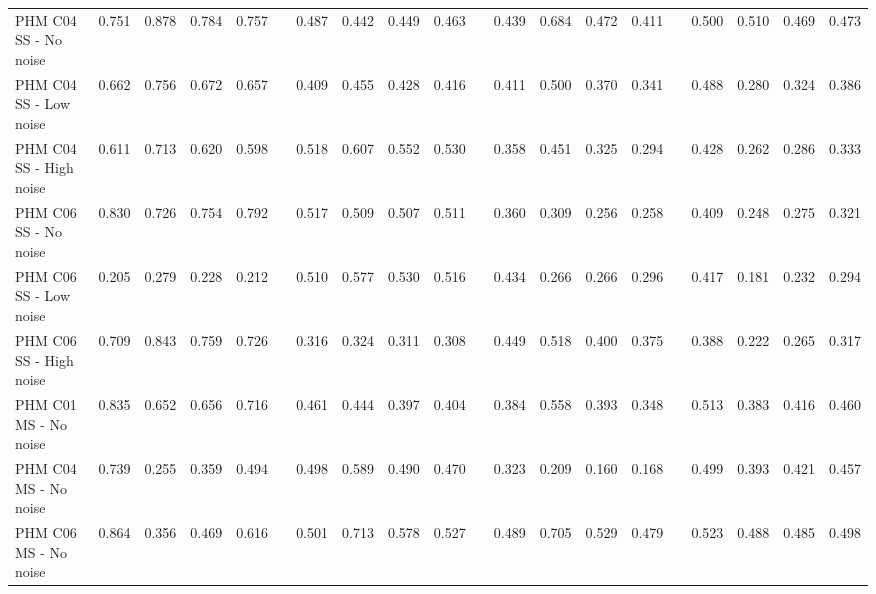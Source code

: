 \documentclass[referee, sn-mathphys-num]{sn-jnl}
\begin{document}
\begin{appendices}
\begin{sidewaystable}
{\begin{tabular}{@{}l| rrrr @{}c| rrrr @{}c| rrrr @{}c| rrrr@{}}
					PHM C04 SS - No noise &\textcolor{dblue}{0.751} &\textcolor{dblue}{0.878} &\textcolor{dblue}{0.784} & \textcolor{dblue}{0.757} & & 0.487 &0.442 &0.449 &0.463 & &0.439 &0.684 &0.472 &0.411 & &0.500 &0.510 &0.469&0.473\\
					PHM C04 SS - Low noise &\textcolor{dblue}{0.662} &\textcolor{dblue}{0.756} &\textcolor{dblue}{0.672} & \textcolor{dblue}{0.657} & & 0.409 &0.455 &0.428 &0.416 & &0.411 &0.500 &0.370 &0.341 & &0.488 &0.280 &0.324&0.386\\
					PHM C04 SS - High noise &\textcolor{dblue}{0.611} &\textcolor{dblue}{0.713} &\textcolor{dblue}{0.620} & \textcolor{dblue}{0.598} & & 0.518 &0.607 &0.552 &0.530 & &0.358 &0.451 &0.325 &0.294 & &0.428 &0.262 &0.286&0.333\\ \hdashline
					
					PHM C06 SS - No noise &\textcolor{dblue}{0.830} &\textcolor{dblue}{0.726} &\textcolor{dblue}{0.754} & \textcolor{dblue}{0.792} & & 0.517 &0.509 &0.507 &0.511 & &0.360 &0.309 &0.256 &0.258 & &0.409 &0.248 &0.275&0.321\\
					PHM C06 SS - Low noise &0.205 &0.279 &0.228 & 0.212 & & \textcolor{dblue}{0.510} &\textcolor{dblue}{0.577} &\textcolor{dblue}{0.530} &\textcolor{dblue}{0.516} & &0.434 &0.266 &0.266 &0.296 & &0.417 &0.181 &0.232&0.294\\
					PHM C06 SS - High noise &\textcolor{dblue}{0.709} &\textcolor{dblue}{0.843} &\textcolor{dblue}{0.759 }& \textcolor{dblue}{0.726} & & 0.316 &0.324 &0.311 &0.308 & &0.449 &0.518 &0.400 &0.375 & &0.388 &0.222 &0.265&0.317\\ \midrule
					
					PHM C01 MS - No noise &\textcolor{dblue}{0.835} &\textcolor{dblue}{0.652} &\textcolor{dblue}{0.656} & \textcolor{dblue}{0.716} & & 0.461 &0.444 &0.397 &0.404 & &0.384 &0.558 &0.393 &0.348 & &0.513 &0.383 &0.416&0.460\\
					PHM C04 MS - No noise &\textcolor{dblue}{0.739} &0.255 &0.359 & \textcolor{dblue}{0.494} & & 0.498 &\textcolor{dblue}{0.589 }&\textcolor{dblue}{0.490} &0.470 & &0.323 &0.209 &0.160 &0.168 & &0.499 &0.393 &0.421&0.457\\
					PHM C06 MS - No noise &\textcolor{dblue}{0.864} &0.356 &0.469 & \textcolor{dblue}{0.616} & & 0.501 &\textcolor{dblue}{0.713} &\textcolor{dblue}{0.578} &0.527 & &0.489 &0.705 &0.529 &0.479 & &0.523 &0.488 &0.485&0.498\\
					
					\bottomrule
			\end{tabular}}
		\end{sidewaystable}
		

\end{appendices}
\end{document}
